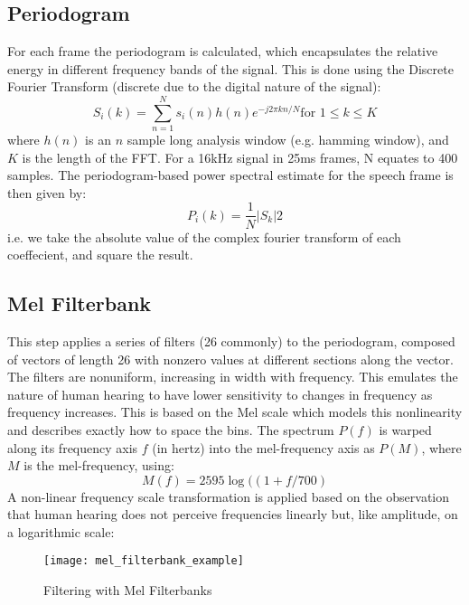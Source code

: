\subsection{Periodogram}
For each frame the periodogram is calculated, which encapsulates the relative energy in different frequency bands of the signal. This is done using the Discrete Fourier Transform (discrete due to the digital nature of the signal):
\begin{equation}
S_{i}(k) = \sum_{n=1}^{N}  s_{i}(n)h(n)e^{-j2\pi kn/N} \text{for } 1 \leq k \leq K
\end{equation}
where $h(n)$ is an $n$ sample long analysis window (e.g. hamming window), and $K$ is the length of the FFT. For a 16kHz signal in 25ms frames, N equates to 400 samples.
The periodogram-based power spectral estimate for the speech frame  is then given by:
\begin{equation}
P_{i}(k) = \frac{1}{N}|S_{k}|{2}
\end{equation}
i.e. we take the absolute value of the complex fourier transform of each coeffecient, and square the result.

\subsection{Mel Filterbank}
This step applies a series of filters (26 commonly) to the periodogram, composed of vectors of length 26 with nonzero values at different sections along the vector.  The filters are nonuniform, increasing in width with frequency. This emulates the nature of human hearing to have lower sensitivity to changes in frequency as frequency increases. This is based on the Mel scale which models this nonlinearity and describes exactly how to space the bins.
The spectrum $P(f)$ is warped along its frequency axis $f$ (in hertz) into the mel-frequency axis as $P(M)$, where $M$ is the mel-frequency, using:
\begin{equation}
M(f) = 2595 \log((1 + f/700)
\end{equation}
A non-linear frequency scale transformation is applied based on the observation that human hearing does not perceive frequencies linearly but, like amplitude, on a logarithmic scale:
\begin{figure}[h]
	\texttt{[image: mel\_filterbank\_example]}
	\caption{Filtering with Mel Filterbanks \cite{practical_cryptography}}
	\label{filterbank}
\end{figure}

